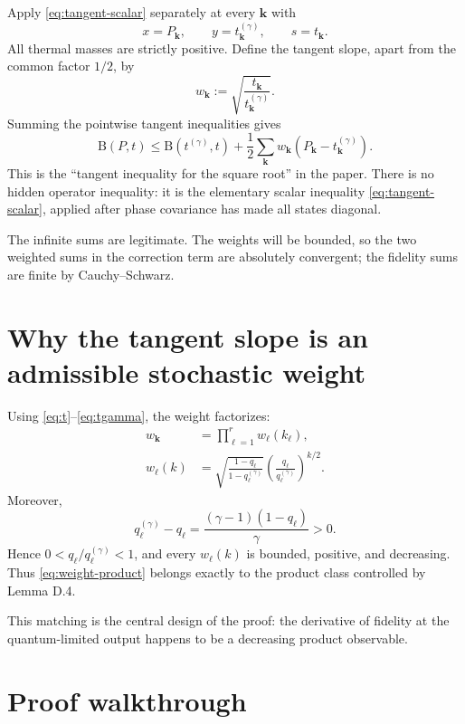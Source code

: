 \documentclass[11pt]{article}
\newcommand{\B}{\mathrm B}
\begin{document}
Apply \eqref{eq:tangent-scalar} separately at every $\mathbf k$ with
\[
  x=P_{\mathbf k},
  \qquad y=t_{\mathbf k}^{(\gamma)},
  \qquad s=t_{\mathbf k}.
\]
All thermal masses are strictly positive.  Define the tangent slope, apart
from the common factor $1/2$, by
\begin{equation}\label{eq:weight}
  w_{\mathbf k}
  :=\sqrt{\frac{t_{\mathbf k}}{t_{\mathbf k}^{(\gamma)}}}.
\end{equation}
Summing the pointwise tangent inequalities gives
\begin{equation}\label{eq:tangent-sum}
  \B(P,t)
  \leq
  \B(t^{(\gamma)},t)
  +\frac12\sum_{\mathbf k}w_{\mathbf k}
      (P_{\mathbf k}-t_{\mathbf k}^{(\gamma)}).
\end{equation}
This is the ``tangent inequality for the square root'' in the paper.  There
is no hidden operator inequality: it is the elementary scalar inequality
\eqref{eq:tangent-scalar}, applied after phase covariance has made all states
diagonal.

The infinite sums are legitimate.  The weights will be bounded, so the two
weighted sums in the correction term are absolutely convergent; the
fidelity sums are finite by Cauchy--Schwarz.

\section{Why the tangent slope is an admissible stochastic weight}

Using \eqref{eq:t}--\eqref{eq:tgamma}, the weight factorizes:
\begin{align}
  w_{\mathbf k}
  &=\prod_{\ell=1}^r w_\ell(k_\ell),
  \label{eq:weight-product}\\
  w_\ell(k)
  &=\sqrt{\frac{1-q_\ell}{1-q_\ell^{(\gamma)}}}
    \left(\frac{q_\ell}{q_\ell^{(\gamma)}}\right)^{k/2}.
  \label{eq:one-weight}
\end{align}
Moreover,
\[
  q_\ell^{(\gamma)}-q_\ell
  =\frac{(\gamma-1)(1-q_\ell)}{\gamma}>0.
\]
Hence $0<q_\ell/q_\ell^{(\gamma)}<1$, and every $w_\ell(k)$ is bounded,
positive, and decreasing.  Thus \eqref{eq:weight-product} belongs exactly to
the product class controlled by Lemma D.4.

This matching is the central design of the proof: the derivative of
fidelity at the quantum-limited output happens to be a decreasing product
observable.

\section{Proof walkthrough}
\end{document}
